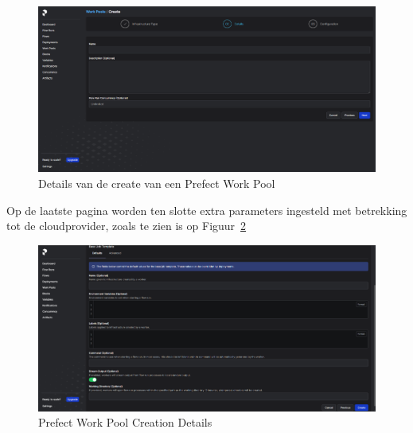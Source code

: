 \begin{figure}[h]
    \centering
    \includegraphics[width=0.9\linewidth]{graphics/Prefect_Work_Pools_Create_Details.PNG}
    \caption{Details van de create van een Prefect Work Pool}
    \label{fig:Prefect_Work_Pools_Create_Details}
\end{figure}

Op de laatste pagina worden ten slotte extra parameters ingesteld met betrekking tot de cloudprovider, zoals te zien is op Figuur~\ref{fig:Prefect_Work_Pools_Create_parameters}

\begin{figure}[h]
    \centering
    \includegraphics[width=0.9\linewidth]{graphics/Prefect_Work_Pools_Create_Parameters.PNG}
    \caption{Prefect Work Pool Creation Details}
    \label{fig:Prefect_Work_Pools_Create_parameters}
\end{figure}